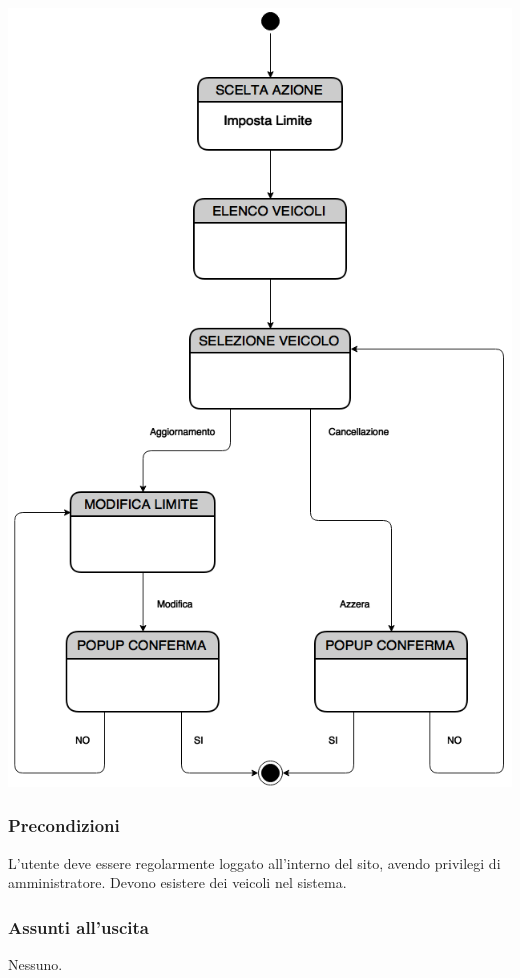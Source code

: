 \documentclass[a4paper,12pt]{article}
\begin{document}
\begin{center}
\includegraphics[scale=0.4]{Limite.png}
\end{center}
\subsubsection{Precondizioni}
L'utente deve essere regolarmente loggato all'interno del sito, avendo privilegi di amministratore. Devono esistere dei veicoli nel sistema.
\subsubsection{Assunti all'uscita}
Nessuno.

\pagebreak
\end{document}
